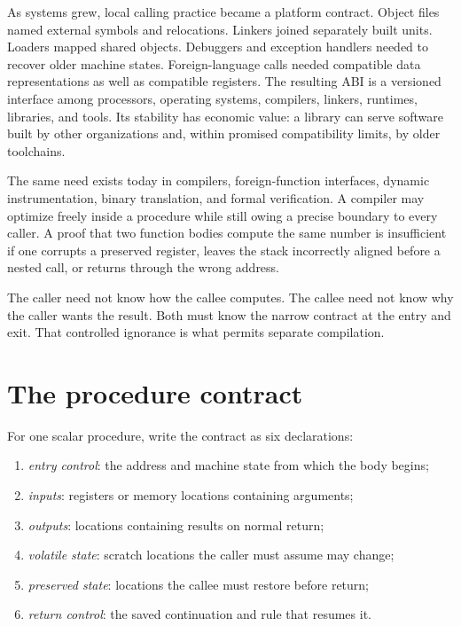 As systems grew, local calling practice became a platform contract. Object
files named external symbols and relocations. Linkers joined separately built
units. Loaders mapped shared objects. Debuggers and exception handlers needed
to recover older machine states. Foreign-language calls needed compatible data
representations as well as compatible registers. The resulting ABI is a
versioned interface among processors, operating systems, compilers, linkers,
runtimes, libraries, and tools. Its stability has economic value: a library can
serve software built by other organizations and, within promised compatibility
limits, by older toolchains.

The same need exists today in compilers, foreign-function interfaces, dynamic
instrumentation, binary translation, and formal verification. A compiler may
optimize freely inside a procedure while still owing a precise boundary to
every caller. A proof that two function bodies compute the same number is
insufficient if one corrupts a preserved register, leaves the stack incorrectly aligned before
a nested call, or returns through the wrong address.

\begin{archive}[title={A procedure boundary makes separate construction possible}]
The caller need not know how the callee computes. The callee need not know why
the caller wants the result. Both must know the narrow contract at the entry
and exit. That controlled ignorance is what permits separate compilation.
\end{archive}

\section{The procedure contract}

For one scalar procedure, write the contract as six declarations:

\begin{enumerate}
\item \emph{entry control}: the address and machine state from which the body
begins;
\item \emph{inputs}: registers or memory locations containing arguments;
\item \emph{outputs}: locations containing results on normal return;
\item \emph{volatile state}: scratch locations the caller must assume may
change;
\item \emph{preserved state}: locations the callee must restore before return;
\item \emph{return control}: the saved continuation and rule that resumes it.
\end{enumerate}

